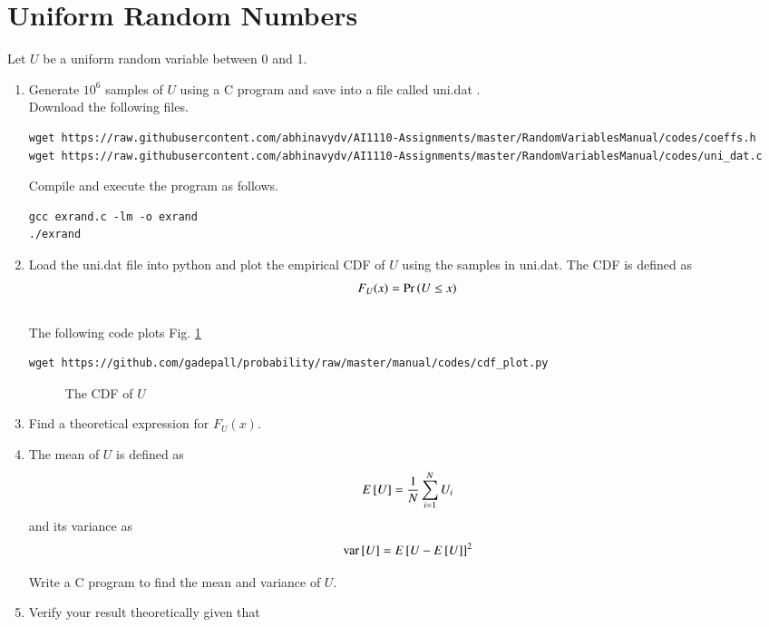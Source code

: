 \documentclass[journal,12pt,twocolumn]{IEEEtran}
\renewcommand\thesection{\arabic{section}}
\begin{document}
\section{Uniform Random Numbers}
Let $U$ be a uniform random variable between 0 and 1.
\begin{enumerate}[label=\thesection.\arabic*
        ,ref=\thesection.\theenumi]
    \item Generate $10^6$ samples of $U$ using a C program and save into a file called uni.dat .\\
          \solution Download the following files.
          \begin{lstlisting}
wget https://raw.githubusercontent.com/abhinavydv/AI1110-Assignments/master/RandomVariablesManual/codes/coeffs.h
wget https://raw.githubusercontent.com/abhinavydv/AI1110-Assignments/master/RandomVariablesManual/codes/uni_dat.c
        \end{lstlisting}

          Compile and execute the program as follows.
          \begin{lstlisting}
gcc exrand.c -lm -o exrand
./exrand
        \end{lstlisting}

    \item
          Load the uni.dat file into python and plot the empirical CDF of $U$ using the samples in uni.dat. The CDF is defined as
          \begin{align}
              F_{U}(x) = \Pr\left(U \le x\right)
          \end{align}
          \\
          \solution  The following code plots Fig. \ref{fig:uni_cdf}
          \begin{lstlisting}
wget https://github.com/gadepall/probability/raw/master/manual/codes/cdf_plot.py
\end{lstlisting}
          \begin{figure}
              \centering
              \caption{The CDF of $U$}
              \label{fig:uni_cdf}
          \end{figure}

    \item
          Find a  theoretical expression for $F_{U}(x)$.

    \item
          The mean of $U$ is defined as
          \begin{equation}
              E{}\left[U\right] = \frac{1}{N}\sum_{i=1}^{N}U_i
          \end{equation}
          and its variance as
          \begin{equation}
              \text{var}{}\left[U\right] = E{}\left[U- E{}\left[U\right]\right]^2
          \end{equation}

          Write a C program to  find the mean and variance of $U$.
    \item Verify your result theoretically given that
\end{enumerate}
\end{document}
